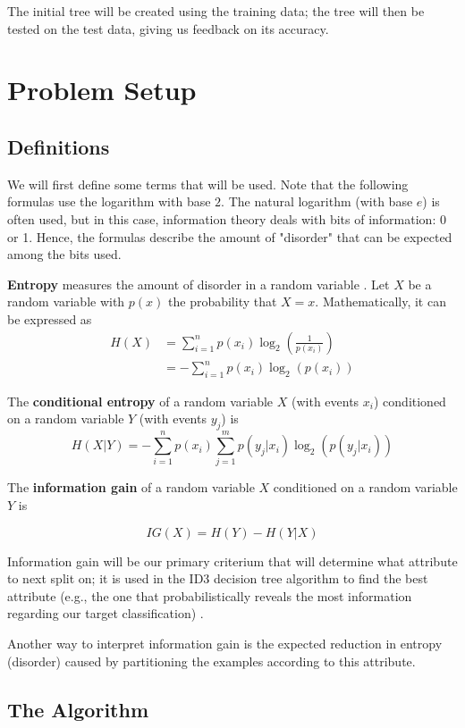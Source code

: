 \documentclass{article}
\begin{document}
The initial tree will be created using the training data; the tree will then be tested on the test data, giving us feedback on its accuracy.

\section{Problem Setup}

\subsection{Definitions}

We will first define some terms that will be used. Note that the following formulas use the logarithm with base $2$. The natural logarithm (with base $e$) is often used, but in this case, information theory deals with bits of information: 0 or 1. Hence, the formulas describe the amount of "disorder" that can be expected among the bits used.

\textbf{Entropy} measures the amount of disorder in a random variable \cite{segaran2007}. Let $X$ be a random variable with $p(x)$ the probability that $X = x$. Mathematically, it can be expressed as 
\begin{align*}
 H(X) &= \sum_{i=1}^{n} p(x_i)\log_{2}\left(\frac{1}{p(x_i)}\right) \\
&= -\sum_{i=1}^{n}p(x_i)\log_{2}\left(p(x_i)\right)
\end{align*}

The \textbf{conditional entropy} of a random variable $X$ (with events $x_i$) conditioned on a random variable $Y$ (with events $y_j$) is
$$ H(X|Y) = -\sum_{i=1}^{n}p(x_i)\sum_{j=1}^{m}p(y_j|x_i)\log_2\left(p(y_j|x_i)\right) $$

The \textbf{information gain} of a random variable $X$ conditioned on a random variable $Y$ is

$$ IG(X) = H(Y) - H(Y|X) $$

Information gain will be our primary criterium that will determine what attribute to next split on; it is used in the ID3 decision tree algorithm to find the best attribute (e.g., the one that probabilistically reveals the most information regarding our target classification) \cite{mitchell1997}.

Another way to interpret information gain is the expected reduction in entropy (disorder) caused by partitioning the examples according to this attribute.

\subsection{The Algorithm}
\end{document}
